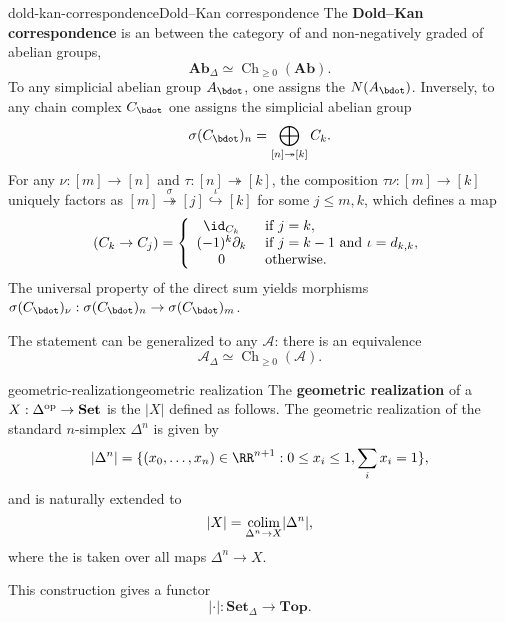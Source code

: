 \begin{topic}{dold-kan-correspondence}{Dold--Kan correspondence}
    The \textbf{Dold--Kan correspondence} is an  between the category of   and non-negatively graded  of abelian groups,
    \[ \textbf{Ab}_\Delta \simeq \operatorname{Ch}_{\ge 0}(\textbf{Ab}) . \]
    To any simplicial abelian group $A_\bdot$, one assigns the  $N(A_\bdot)$.
    Inversely, to any chain complex $C_\bdot$ one assigns the simplicial abelian group
    \[ \sigma(C_\bdot)_n = \bigoplus_{[n] \twoheadrightarrow [k]} C_k . \]
    For any $\nu : [m] \to [n]$ and $\tau : [n] \twoheadrightarrow [k]$, the composition $\tau\nu : [m] \to [k]$ uniquely factors as $[m] \overset{\sigma}{\twoheadrightarrow} [j] \overset{\iota}{\hookrightarrow} [k]$ for some $j \le m, k$, which defines a map
    \[ (C_k \to C_j) = \left\{ \begin{array}{cl} \id_{C_k} & \textup{ if } j = k , \\ (-1)^k \partial_k & \textup{ if } j = k - 1 \textup{ and } \iota = d_{k,k} , \\ 0 & \textup{ otherwise}. \end{array} \right. \]
    The universal property of the direct sum yields morphisms $\sigma(C_\bdot)_\nu : \sigma(C_\bdot)_n \to \sigma(C_\bdot)_m$.
    
    The statement can be generalized to any  $\mathcal{A}$: there is an equivalence
    \[ \mathcal{A}_\Delta \simeq \operatorname{Ch}_{\ge 0}(\mathcal{A}) . \]
\end{topic}

\begin{topic}{geometric-realization}{geometric realization}
    The \textbf{geometric realization} of a  $X : \Delta^\textup{op} \to \textbf{Set}$ is the  $|X|$ defined as follows. The geometric realization of the standard $n$-simplex $\Delta^n$ is given by
    \[ |\Delta^n| = \{ (x_0, \ldots, x_n) \in \RR^{n + 1} : 0 \le x_i \le 1, \sum_i x_i = 1 \} , \]
    and is naturally extended to
    \[ |X| = \underset{\Delta^n \to X}{\textup{colim}} |\Delta^n| , \]
    where the  is taken over all maps $\Delta^n \to X$.
    
    This construction gives a functor
    \[ |\cdot| : \textbf{Set}_\Delta \to \textbf{Top} . \]
\end{topic}


